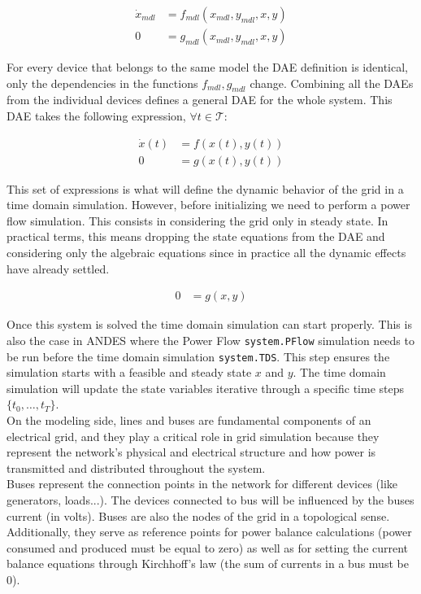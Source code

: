 \documentclass{report}
\begin{document}
\begin{align}
    \dot{x}_{mdl} &= f_{mdl}(x_{mdl}, y_{mdl}, x, y) \\
0 &= g_{mdl}(x_{mdl}, y_{mdl}, x, y) 
\end{align}

For every device that belongs to the same model the DAE definition is identical, only the dependencies in the functions $f_{mdl}, g_{mdl}$ change. Combining all the DAEs from the individual devices defines a general DAE for the whole system. This DAE takes the following expression, $\forall t \in \mathcal{T}$:   

\begin{align}
    \dot{x}(t) &= f(x(t), y(t)) \\
    0 &= g(x(t), y(t)) 
\end{align}

This set of expressions is what will define the dynamic behavior of the grid in a time domain simulation. However, before initializing we need to perform a power flow simulation. This consists in considering the grid only in steady state. In practical terms, this means dropping the state equations from the DAE and considering only the algebraic equations since in practice all the dynamic effects have already settled.

\begin{align}
    0 &= g(x, y) 
\end{align}

Once this system is solved the time domain simulation can start properly. This is also the case in ANDES where the Power Flow \lstinline!system.PFlow! simulation needs to be run before the time domain simulation \lstinline!system.TDS!. This step ensures the simulation starts with a feasible and steady state $x$ and $y$. The time domain simulation will update the state variables iterative through a specific time steps $\{t_0, \dots , t_T\}$. \\

On the modeling side, lines and buses are fundamental components of an electrical grid, and they play a critical role in grid simulation because they represent the network's physical and electrical structure and how power is transmitted and distributed throughout the system.\\

Buses represent the connection points in the network for different devices (like generators, loads...). The devices connected to bus will be  
influenced by the buses current (in volts). Buses are also the nodes of the grid in a topological sense. Additionally, they serve as reference points for power balance calculations (power consumed and produced must be equal to zero) as well as for setting the current balance equations through Kirchhoff's law (the sum of currents in a bus must be 0).  
\end{document}
